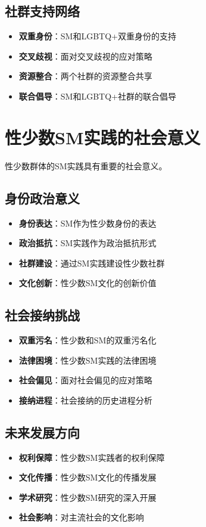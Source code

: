 \documentclass[12pt,UTF8]{ctexbook}
\begin{document}
\subsection{社群支持网络}
\begin{itemize}[leftmargin=2cm]
	\item \textbf{双重身份}：SM和LGBTQ+双重身份的支持
	\item \textbf{交叉歧视}：面对交叉歧视的应对策略
	\item \textbf{资源整合}：两个社群的资源整合共享
	\item \textbf{联合倡导}：SM和LGBTQ+社群的联合倡导
\end{itemize}

\section{性少数SM实践的社会意义}
性少数群体的SM实践具有重要的社会意义。

\subsection{身份政治意义}
\begin{itemize}[leftmargin=2cm]
	\item \textbf{身份表达}：SM作为性少数身份的表达
	\item \textbf{政治抵抗}：SM实践作为政治抵抗形式
	\item \textbf{社群建设}：通过SM实践建设性少数社群
	\item \textbf{文化创新}：性少数SM文化的创新价值
\end{itemize}

\subsection{社会接纳挑战}
\begin{itemize}[leftmargin=2cm]
	\item \textbf{双重污名}：性少数和SM的双重污名化
	\item \textbf{法律困境}：性少数SM实践的法律困境
	\item \textbf{社会偏见}：面对社会偏见的应对策略
	\item \textbf{接纳进程}：社会接纳的历史进程分析
\end{itemize}

\subsection{未来发展方向}
\begin{itemize}[leftmargin=2cm]
	\item \textbf{权利保障}：性少数SM实践者的权利保障
	\item \textbf{文化传播}：性少数SM文化的传播发展
	\item \textbf{学术研究}：性少数SM研究的深入开展
	\item \textbf{社会影响}：对主流社会的文化影响
\end{itemize}
\end{document}
